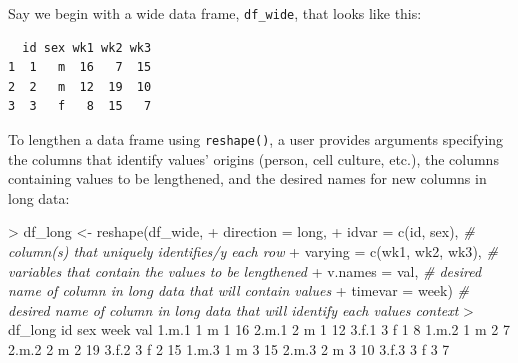 \documentclass[
]{book}
\newenvironment{Shaded}{\begin{snugshade}}{\end{snugshade}}
\newcommand{\AttributeTok}[1]{\textcolor[rgb]{0.77,0.63,0.00}{#1}}
\newcommand{\CommentTok}[1]{\textcolor[rgb]{0.56,0.35,0.01}{\textit{#1}}}
\newcommand{\DecValTok}[1]{\textcolor[rgb]{0.00,0.00,0.81}{#1}}
\newcommand{\FloatTok}[1]{\textcolor[rgb]{0.00,0.00,0.81}{#1}}
\newcommand{\FunctionTok}[1]{\textcolor[rgb]{0.00,0.00,0.00}{#1}}
\newcommand{\NormalTok}[1]{#1}
\newcommand{\OtherTok}[1]{\textcolor[rgb]{0.56,0.35,0.01}{#1}}
\newcommand{\SpecialCharTok}[1]{\textcolor[rgb]{0.00,0.00,0.00}{#1}}
\newcommand{\StringTok}[1]{\textcolor[rgb]{0.31,0.60,0.02}{#1}}
\begin{document}
Say we begin with a wide data frame, \texttt{df\_wide}, that looks like this:

\begin{verbatim}
  id sex wk1 wk2 wk3
1  1   m  16   7  15
2  2   m  12  19  10
3  3   f   8  15   7
\end{verbatim}

To lengthen a data frame using \texttt{reshape()}, a user provides arguments specifying the columns that identify values' origins (person, cell culture, etc.), the columns containing values to be lengthened, and the desired names for new columns in long data:

\begin{Shaded}
\begin{Highlighting}[]
\SpecialCharTok{\textgreater{}}\NormalTok{ df\_long }\OtherTok{\textless{}{-}} \FunctionTok{reshape}\NormalTok{(df\_wide,}
\SpecialCharTok{+}                         \AttributeTok{direction =} \StringTok{\textquotesingle{}long\textquotesingle{}}\NormalTok{,}
\SpecialCharTok{+}                         \AttributeTok{idvar =} \FunctionTok{c}\NormalTok{(}\StringTok{\textquotesingle{}id\textquotesingle{}}\NormalTok{, }\StringTok{\textquotesingle{}sex\textquotesingle{}}\NormalTok{), }\CommentTok{\# column(s) that uniquely identifies/y each row}
\SpecialCharTok{+}                         \AttributeTok{varying =} \FunctionTok{c}\NormalTok{(}\StringTok{\textquotesingle{}wk1\textquotesingle{}}\NormalTok{, }\StringTok{\textquotesingle{}wk2\textquotesingle{}}\NormalTok{, }\StringTok{\textquotesingle{}wk3\textquotesingle{}}\NormalTok{), }\CommentTok{\# variables that contain the values to be lengthened}
\SpecialCharTok{+}                         \AttributeTok{v.names =} \StringTok{\textquotesingle{}val\textquotesingle{}}\NormalTok{, }\CommentTok{\# desired name of column in long data that will contain values}
\SpecialCharTok{+}                         \AttributeTok{timevar =} \StringTok{\textquotesingle{}week\textquotesingle{}}\NormalTok{) }\CommentTok{\# desired name of column in long data that will identify each value\textquotesingle{}s context}
\SpecialCharTok{\textgreater{}}\NormalTok{ df\_long}
\NormalTok{      id sex week val}
\FloatTok{1.}\NormalTok{m}\FloatTok{.1}  \DecValTok{1}\NormalTok{   m    }\DecValTok{1}  \DecValTok{16}
\FloatTok{2.}\NormalTok{m}\FloatTok{.1}  \DecValTok{2}\NormalTok{   m    }\DecValTok{1}  \DecValTok{12}
\FloatTok{3.}\NormalTok{f}\FloatTok{.1}  \DecValTok{3}\NormalTok{   f    }\DecValTok{1}   \DecValTok{8}
\FloatTok{1.}\NormalTok{m}\FloatTok{.2}  \DecValTok{1}\NormalTok{   m    }\DecValTok{2}   \DecValTok{7}
\FloatTok{2.}\NormalTok{m}\FloatTok{.2}  \DecValTok{2}\NormalTok{   m    }\DecValTok{2}  \DecValTok{19}
\FloatTok{3.}\NormalTok{f}\FloatTok{.2}  \DecValTok{3}\NormalTok{   f    }\DecValTok{2}  \DecValTok{15}
\FloatTok{1.}\NormalTok{m}\FloatTok{.3}  \DecValTok{1}\NormalTok{   m    }\DecValTok{3}  \DecValTok{15}
\FloatTok{2.}\NormalTok{m}\FloatTok{.3}  \DecValTok{2}\NormalTok{   m    }\DecValTok{3}  \DecValTok{10}
\FloatTok{3.}\NormalTok{f}\FloatTok{.3}  \DecValTok{3}\NormalTok{   f    }\DecValTok{3}   \DecValTok{7}
\end{Highlighting}
\end{Shaded}
\end{document}
